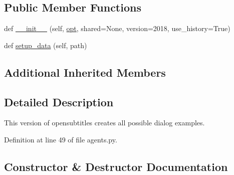 \subsection*{Public Member Functions}
\begin{DoxyCompactItemize}
\item 
def \hyperlink{classparlai_1_1tasks_1_1opensubtitles_1_1agents_1_1FullTeacher_aadd6073a3a0cd25d780679e824fb0673}{\+\_\+\+\_\+init\+\_\+\+\_\+} (self, \hyperlink{classparlai_1_1core_1_1teachers_1_1FbDialogTeacher_af7a9ec497b9cd0292d7b8fa220da7c28}{opt}, shared=None, version=\textquotesingle{}2018\textquotesingle{}, use\+\_\+history=True)
\item 
def \hyperlink{classparlai_1_1tasks_1_1opensubtitles_1_1agents_1_1FullTeacher_abd9f716304f56c2b8b7f7573d34c87f6}{setup\+\_\+data} (self, path)
\end{DoxyCompactItemize}
\subsection*{Additional Inherited Members}


\subsection{Detailed Description}
\begin{DoxyVerb}This version of opensubtitles creates all possible dialog examples.\end{DoxyVerb}
 

Definition at line 49 of file agents.\+py.



\subsection{Constructor \& Destructor Documentation}
\mbox{\label{classparlai_1_1tasks_1_1opensubtitles_1_1agents_1_1FullTeacher_aadd6073a3a0cd25d780679e824fb0673}} 
